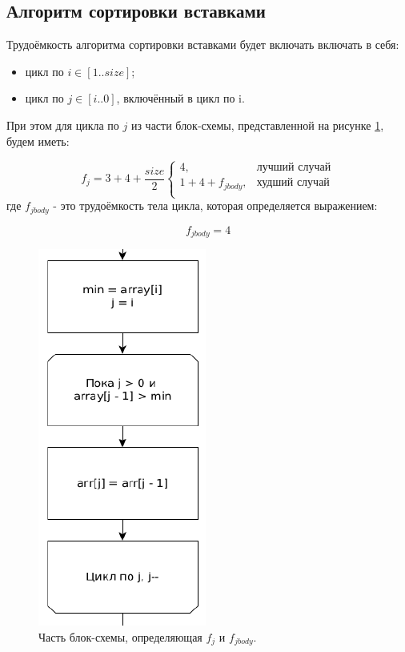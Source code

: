 \documentclass[12pt]{report}
\begin{document}
\subsection{Алгоритм сортировки вставками}
Трудоёмкость алгоритма сортировки вставками будет включать включать в себя:
\begin{itemize}
\item цикл по $i \in [1..size]$;
\item цикл по $j \in [i..0]$, включённый в цикл по i.
\end{itemize}

При этом для цикла по $j$ из части блок-схемы, представленной на рисунке \ref{img:insertion:fj}, будем иметь:

\begin{equation}
f_{j} = 3 + 4 + \frac{size}{2}\begin{cases}
				4, & \textbf{лучший случай}\\
				1 + 4 + f_{jbody}, & \textbf{худший случай}\\
				\end{cases}
\end{equation}
где $f_{jbody}$ - это трудоёмкость тела цикла, которая определяется выражением:

\begin{equation}
f_{jbody} = 4
\end{equation}

\begin{figure}
\begin{center}
\includegraphics[scale=0.4]{inc/img/insertionfj.png}
\captionsetup{justification=centering}
	\caption{Часть блок-схемы, определяющая $f_{j}$ и $f_{j body}$.}
	\label{img:insertion:fj}	
\end{center}
\end{figure}
\end{document}
